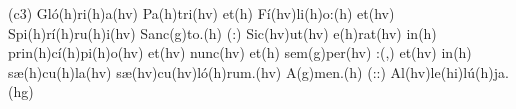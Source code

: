 (c3) Gló(h)ri(h)a(hv) Pa(h)tri(hv) et(h) Fí(hv)li(h)o:(h) et(hv) Spi(h)rí(h)ru(h)i(hv) Sanc(g)to.(h) (:) Sic(hv)ut(hv) e(h)rat(hv) in(h) prin(h)cí(h)pi(h)o(hv) et(hv) nunc(hv) et(h) sem(g)per(hv) :(,) et(hv) in(h) sæ(h)cu(h)la(hv) sæ(hv)cu(hv)ló(h)rum.(hv) A(g)men.(h) (::) Al(hv)le(hi)lú(h)ja.(hg)